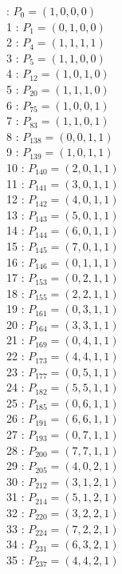 \documentclass{article}
\begin{document}
{\begin{multicols}{3}
 : $P_{0}=( 1, 0, 0, 0 )$\\
1 : $P_{1}=( 0, 1, 0, 0 )$\\
2 : $P_{4}=( 1, 1, 1, 1 )$\\
3 : $P_{5}=( 1, 1, 0, 0 )$\\
4 : $P_{12}=( 1, 0, 1, 0 )$\\
5 : $P_{20}=( 1, 1, 1, 0 )$\\
6 : $P_{75}=( 1, 0, 0, 1 )$\\
7 : $P_{83}=( 1, 1, 0, 1 )$\\
8 : $P_{138}=( 0, 0, 1, 1 )$\\
9 : $P_{139}=( 1, 0, 1, 1 )$\\
10 : $P_{140}=( 2, 0, 1, 1 )$\\
11 : $P_{141}=( 3, 0, 1, 1 )$\\
12 : $P_{142}=( 4, 0, 1, 1 )$\\
13 : $P_{143}=( 5, 0, 1, 1 )$\\
14 : $P_{144}=( 6, 0, 1, 1 )$\\
15 : $P_{145}=( 7, 0, 1, 1 )$\\
16 : $P_{146}=( 0, 1, 1, 1 )$\\
17 : $P_{153}=( 0, 2, 1, 1 )$\\
18 : $P_{155}=( 2, 2, 1, 1 )$\\
19 : $P_{161}=( 0, 3, 1, 1 )$\\
20 : $P_{164}=( 3, 3, 1, 1 )$\\
21 : $P_{169}=( 0, 4, 1, 1 )$\\
22 : $P_{173}=( 4, 4, 1, 1 )$\\
23 : $P_{177}=( 0, 5, 1, 1 )$\\
24 : $P_{182}=( 5, 5, 1, 1 )$\\
25 : $P_{185}=( 0, 6, 1, 1 )$\\
26 : $P_{191}=( 6, 6, 1, 1 )$\\
27 : $P_{193}=( 0, 7, 1, 1 )$\\
28 : $P_{200}=( 7, 7, 1, 1 )$\\
29 : $P_{205}=( 4, 0, 2, 1 )$\\
30 : $P_{212}=( 3, 1, 2, 1 )$\\
31 : $P_{214}=( 5, 1, 2, 1 )$\\
32 : $P_{220}=( 3, 2, 2, 1 )$\\
33 : $P_{224}=( 7, 2, 2, 1 )$\\
34 : $P_{231}=( 6, 3, 2, 1 )$\\
35 : $P_{237}=( 4, 4, 2, 1 )$\\

\end{multicols}}
\end{document}
